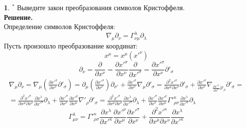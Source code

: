 \documentclass[12pt]{article}
\theoremstyle{definition}
\newtheorem{zad}{}[section]
\begin{document}
\begin{zad}\label{zad2}
\textbf{$^*$} Выведите закон преобразования символов Кристоффеля.\\
\textbf{Решение.}\\
Определение символов Кристоффеля:
\begin{equation}
    \nabla_\mu\partial_\nu=\Gamma^\lambda_{\nu\mu}\partial_\lambda
\end{equation}
Пусть произошло преобразование координат:
\begin{equation}
    x^\mu=x^\mu(x'^\nu)
\end{equation}
\begin{equation}
    \partial_\nu=\frac{\partial}{\partial x^\nu}=\frac{\partial x'^\sigma}{\partial x^\nu}\frac{\partial}{\partial x'^\sigma}=\frac{\partial x'^\sigma}{\partial x^\nu}\partial'_{\sigma}
\end{equation}
\begin{multline}
    \nabla_\mu\partial_\nu=\nabla_\mu\left(\frac{\partial x'^\sigma}{\partial x^\nu}\partial'_\sigma\right)=\partial_\mu\left(\frac{\partial x'^\sigma}{\partial x^\nu}\right)\partial_{\sigma'}+\frac{\partial x'^\sigma}{\partial x^\nu}\nabla_\mu\partial'_\sigma=\frac{\partial^2 x'^\sigma}{\partial x^\mu\partial x^\nu}\partial'_\sigma+\frac{\partial x'^\sigma}{\partial x^\nu}\nabla_{\frac{\partial x'^\rho}{\partial x^\mu}\partial'_\rho}\partial'_\sigma=\\=\frac{\partial^2 x'^\sigma}{\partial x^\mu\partial x^\nu}\frac{\partial x^\lambda}{\partial x'^\sigma}\partial_{\lambda}+\frac{\partial x'^\sigma}{\partial x^\nu}\frac{\partial x'^\rho}{\partial x^\mu}\nabla'_\rho\partial'_\sigma=\frac{\partial^2 x'^\sigma}{\partial x^\mu\partial x^\nu}\frac{\partial x^\lambda}{\partial x'^\sigma}\partial_{\lambda}+\frac{\partial x'^\sigma}{\partial x^\nu}\frac{\partial x'^\rho}{\partial x^\mu}\Gamma'^\kappa_{\rho\sigma}\frac{\partial x^\lambda}{\partial x'^\kappa}\partial_{\lambda}
\end{multline}
\begin{equation}
    \boxed{\Gamma^\lambda_{\mu\nu}=\Gamma'^\kappa_{\rho\sigma}\frac{\partial x^\lambda}{\partial x'^\kappa}\frac{\partial x'^\rho}{\partial x^\mu}\frac{\partial x'^\sigma}{\partial x^\nu}+\frac{\partial^2 x'^\kappa}{\partial x^\mu\partial x^\nu}\frac{\partial x^\lambda}{\partial x'^\kappa}}
\end{equation}
\end{zad}
\end{document}
